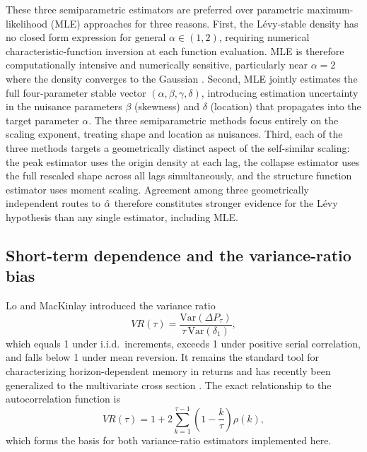 \documentclass[conference]{IEEEtran}
\begin{document}
These three semiparametric estimators are preferred over parametric
maximum-likelihood (MLE) approaches for three reasons.
First, the Lévy-stable density has no closed form expression for general
$\alpha\in(1,2)$, requiring numerical characteristic-function inversion at
each function evaluation. MLE is therefore computationally intensive and
numerically sensitive, particularly near $\alpha=2$ where the density
converges to the Gaussian \cite{Nolan2020}.
Second, MLE jointly estimates the full four-parameter stable vector
$(\alpha,\beta,\gamma,\delta)$, introducing estimation uncertainty in the
nuisance parameters $\beta$ (skewness) and $\delta$ (location) that
propagates into the target parameter $\alpha$. The three semiparametric
methods focus entirely on the scaling exponent, treating shape and location
as nuisances.
Third, each of the three methods targets a geometrically distinct aspect of
the self-similar scaling: the peak estimator uses the origin density at each
lag, the collapse estimator uses the full rescaled shape across all lags
simultaneously, and the structure function estimator uses moment scaling.
Agreement among three geometrically independent routes to $\hat{\alpha}$
therefore constitutes stronger evidence for the Lévy hypothesis than any
single estimator, including MLE.

\subsection{Short-term dependence and the variance-ratio bias}
\label{sec:background:vr}

Lo and MacKinlay \cite{LoMacKinlay1988} introduced the variance ratio
\begin{equation}
  VR(\tau) = \frac{\mathrm{Var}(\Delta P_\tau)}{\tau\,\mathrm{Var}(\delta_1)},
  \label{eq:vr}
\end{equation}
which equals 1 under i.i.d.\ increments, exceeds 1 under positive serial
correlation, and falls below 1 under mean reversion. It remains the standard
tool for characterizing horizon-dependent memory in returns and has recently
been generalized to the multivariate cross section \cite{Froseth2026}.
The exact relationship to the autocorrelation function is
\begin{equation}
  VR(\tau)
  = 1 + 2\sum_{k=1}^{\tau-1}\!\left(1-\frac{k}{\tau}\right)\rho(k),
  \label{eq:vr_rho}
\end{equation}
which forms the basis for both variance-ratio estimators implemented here.
\end{document}

